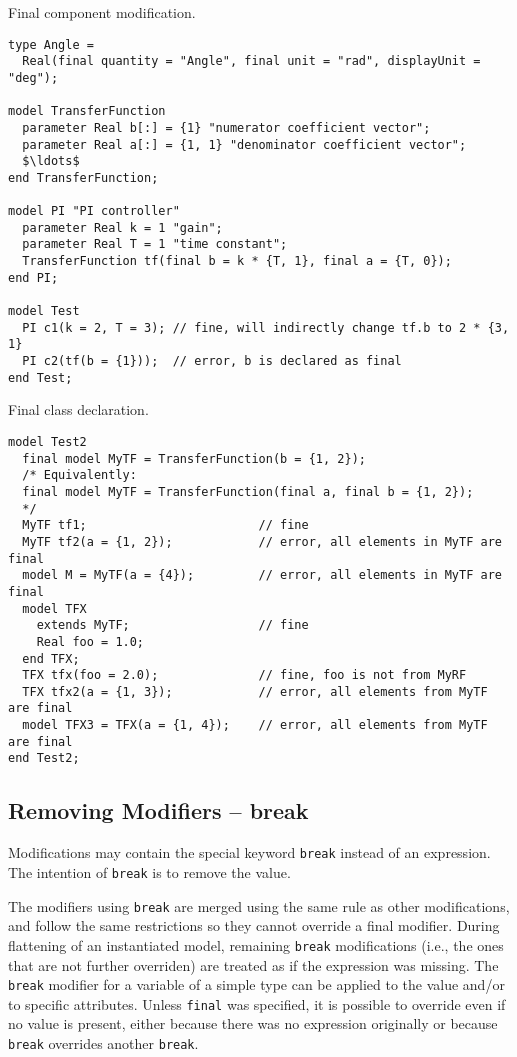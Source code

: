\begin{example}
Final component modification.
\begin{lstlisting}[language=modelica]
type Angle =
  Real(final quantity = "Angle", final unit = "rad", displayUnit = "deg");

model TransferFunction
  parameter Real b[:] = {1} "numerator coefficient vector";
  parameter Real a[:] = {1, 1} "denominator coefficient vector";
  $\ldots$
end TransferFunction;

model PI "PI controller"
  parameter Real k = 1 "gain";
  parameter Real T = 1 "time constant";
  TransferFunction tf(final b = k * {T, 1}, final a = {T, 0});
end PI;

model Test
  PI c1(k = 2, T = 3); // fine, will indirectly change tf.b to 2 * {3, 1}
  PI c2(tf(b = {1}));  // error, b is declared as final
end Test;
\end{lstlisting}
\end{example}

\begin{example}
Final class declaration.
\begin{lstlisting}[language=modelica]
model Test2
  final model MyTF = TransferFunction(b = {1, 2});
  /* Equivalently:
  final model MyTF = TransferFunction(final a, final b = {1, 2});
  */
  MyTF tf1;                        // fine
  MyTF tf2(a = {1, 2});            // error, all elements in MyTF are final
  model M = MyTF(a = {4});         // error, all elements in MyTF are final
  model TFX
    extends MyTF;                  // fine
    Real foo = 1.0;
  end TFX;
  TFX tfx(foo = 2.0);              // fine, foo is not from MyRF
  TFX tfx2(a = {1, 3});            // error, all elements from MyTF are final
  model TFX3 = TFX(a = {1, 4});    // error, all elements from MyTF are final
end Test2;
\end{lstlisting}
\end{example}

\subsection{Removing Modifiers -- break}\label{removing-modifiers-break}
Modifications may contain the special keyword \lstinline!break! instead of an expression.
The intention of \lstinline!break! is to remove the value.

The modifiers using \lstinline!break! are merged using the same rule as other modifications, and follow the same restrictions so they cannot override a final modifier.
During flattening of an instantiated model, remaining \lstinline!break! modifications (i.e., the ones that are not further overriden) are treated as if the expression was missing.
The \lstinline!break! modifier for a variable of a simple type can be applied to the value and/or to specific attributes.
Unless \lstinline!final! was specified, it is possible to override even if no value is present, either because there was no expression originally or because \lstinline!break! overrides another \lstinline!break!.

